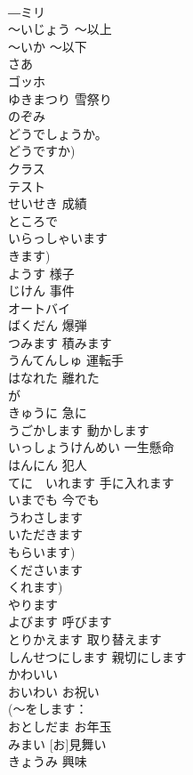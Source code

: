 \documentclass[8pt]{extreport}
\begin{document}
\begin{CJK}{UTF8}{min}
\\	―ミリ			
\\	～いじょう	～以上	
\\	～いか	～以下	
\\	さあ			
\\	ゴッホ			
\\	ゆきまつり	雪祭り	
\\	のぞみ			
\\	どうでしょうか。			
\\	どうですか)		
\\	クラス			
\\	テスト			
\\	せいせき	成績	
\\	ところで			
\\	いらっしゃいます			
\\	きます)		
\\	ようす	様子	
\\	じけん	事件	
\\	オートバイ			
\\	ばくだん	爆弾	
\\	つみます	積みます	
\\	うんてんしゅ	運転手	
\\	はなれた	離れた	
\\	が			
\\	きゅうに	急に	
\\	うごかします	動かします	
\\	いっしょうけんめい	一生懸命	
\\	はんにん	犯人	
\\	てに　いれます	手に入れます	
\\	いまでも	今でも	
\\	うわさします			
\\	いただきます			
\\	もらいます)		
\\	くださいます			
\\	くれます)		
\\	やります			
\\	よびます	呼びます	
\\	とりかえます	取り替えます	
\\	しんせつにします	親切にします	
\\	かわいい			
\\	おいわい	お祝い	
\\	(～をします：
\\	おとしだま	お年玉	
\\	[お]みまい	[お]見舞い	
\\	きょうみ	興味	

\end{CJK}
\end{document}
